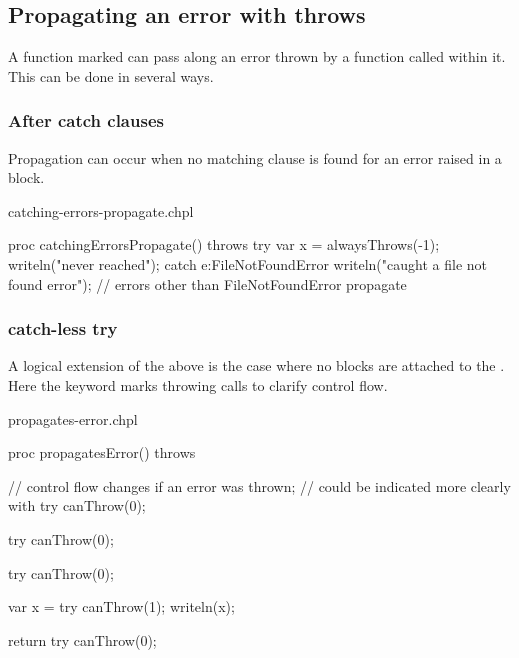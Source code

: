 \subsection{Propagating an error with throws}
\label{Propagating_an_error_with_throws}

A function marked  can pass along an error thrown by a
function called within it. This can be done in several ways.

\subsubsection{After catch clauses}
\label{After_catch_clauses}

Propagation can occur when no matching  clause is found for an
error raised in a  block.

\begin{chapelexample}{catching-errors-propagate.chpl}
\begin{chapel}
proc catchingErrorsPropagate() throws {
  try {
    var x = alwaysThrows(-1);
    writeln("never reached");
  } catch e:FileNotFoundError {
    writeln("caught a file not found error");
  }
  // errors other than FileNotFoundError propagate
}
\end{chapel}
\end{chapelexample}

\subsubsection{catch-less try}
\label{catch_less_try}

A logical extension of the above is the case where no  blocks
are attached to the . Here the  keyword marks throwing
calls to clarify control flow.

\begin{chapelexample}{propagates-error.chpl}
\begin{chapel}
proc propagatesError() throws {
  // control flow changes if an error was thrown;
  // could be indicated more clearly with try
  canThrow(0);

  try canThrow(0);

  try {
    canThrow(0);
  }

  var x = try canThrow(1);
  writeln(x);

  return try canThrow(0);
}
\end{chapel}
\end{chapelexample}

